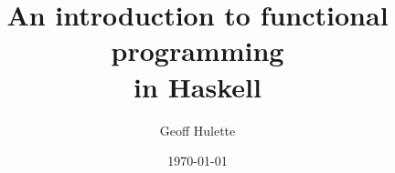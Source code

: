 \documentclass{beamer}
\title{An introduction to functional programming\\in Haskell}
\author{Geoff Hulette}
\date{\today}
\begin{document}
\begin{frame}[plain]
  \titlepage
\end{frame}






\end{document}
